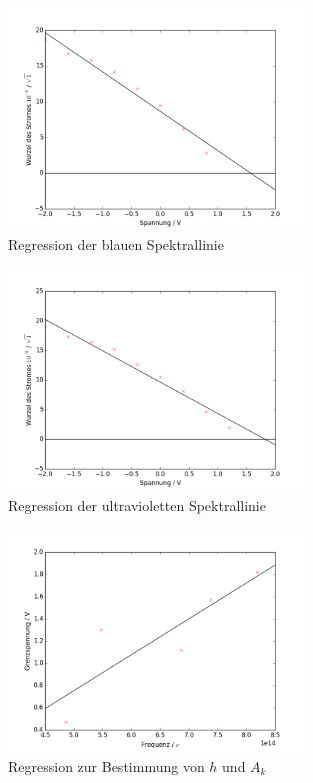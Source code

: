 \begin{figure}[h!]
	\centering
	\includegraphics[width=0.7\textwidth]{build/regression_Farbe:3.png}
	\caption{Regression der blauen Spektrallinie}
	\label{fig:regression_blau}
\end{figure}

\begin{figure}[h!]
	\centering
	\includegraphics[width=0.7\textwidth]{build/regression_Farbe:4.png}
	\caption{Regression der ultravioletten Spektrallinie}
	\label{fig:regression_uv}
\end{figure}

\begin{figure}[h!]
\centering
\includegraphics[width=0.7\textwidth]{build/regression_aufgabe2.png}
\caption{Regression zur Bestimmung von $h$ und $A_k$}
\label{fig:regression2}
\end{figure}


